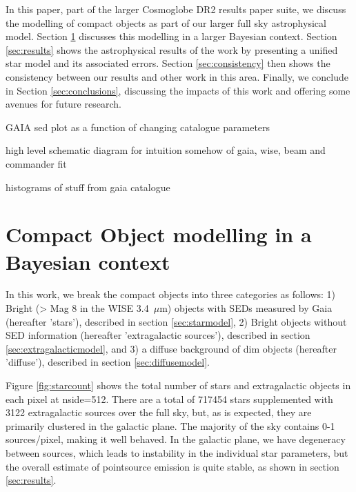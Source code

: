 \documentclass{aa}
\begin{document}
In this paper, part of the larger Cosmoglobe DR2 results paper suite, we discuss the modelling of compact objects as part of our larger full sky astrophysical model. Section \ref{sec:models} discusses this modelling in a larger Bayesian context. Section \ref{sec:results} shows the astrophysical results of the work by presenting a unified star model and its associated errors. Section \ref{sec:consistency} then shows the consistency between our results and other work in this area. Finally, we conclude in Section \ref{sec:conclusions}, discussing the impacts of this work and offering some avenues for future research.

GAIA sed plot as a function of changing catalogue parameters

high level schematic diagram for intuition somehow of gaia, wise, beam and commander fit

histograms of stuff from gaia catalogue

\section{Compact Object modelling in a Bayesian context}
\label{sec:models}

In this work, we break the compact objects into three categories as follows: 1) Bright (> Mag 8 in the WISE 3.4 $\,\mu$m) objects with SEDs measured by Gaia (hereafter 'stars'), described in section \ref{sec:starmodel}, 2) Bright objects without SED information (hereafter 'extragalactic sources'), described in section \ref{sec:extragalacticmodel}, and 3) a diffuse background of dim objects (hereafter 'diffuse'), described in section \ref{sec:diffusemodel}.

Figure \ref{fig:starcount} shows the total number of stars and extragalactic objects in each pixel at nside=512. There are a total of 717454 stars supplemented with 3122 extragalactic sources over the full sky, but, as is expected, they are primarily clustered in the galactic plane. The majority of the sky contains 0-1 sources/pixel, making it well behaved. In the galactic plane, we have degeneracy between sources, which leads to instability in the individual star parameters, but the overall estimate of pointsource emission is quite stable, as shown in section \ref{sec:results}.
\end{document}
